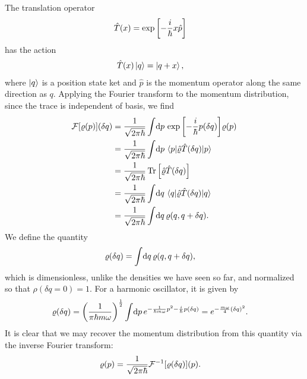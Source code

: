 The translation operator~\cite[651]{messiah1999quantum}
\begin{align}
	\hat{T}(x)
	&= \exp{\left[ - \frac{i}{\hbar} x \hat{p} \right]}
\end{align}
has the action~\cite[650]{messiah1999quantum}
\begin{align}
	\hat{T}(x) \ket{q}
	&= \ket{q + x},
\end{align}
where $\ket{q}$ is a position state ket and $\hat{p}$ is the momentum operator along the same direction as $q$.
Applying the Fourier transform to the momentum distribution, since the trace is independent of basis, we find
\begin{subequations}
\begin{align}
	\mathcal{F}[\rho(p)](\delta q)
	&= \frac{1}{\sqrt{2 \pi \hbar}} \int\! \dif p \, \expb{-\frac{i}{\hbar} p (\delta q)} \rho(p) \\
	&= \frac{1}{\sqrt{2 \pi \hbar}} \int\! \dif p \, \braket{p | \hat{\rho} \hat{T}(\delta q) | p} \\
	&= \frac{1}{\sqrt{2 \pi \hbar}} \Tr{\left[ \hat{\rho} \hat{T}(\delta q) \right]} \\
	&= \frac{1}{\sqrt{2 \pi \hbar}} \int\! \dif q \, \braket{q | \hat{\rho} \hat{T}(\delta q) | q} \\
	&= \frac{1}{\sqrt{2 \pi \hbar}} \int\! \dif q \, \rho(q, q + \delta q).
\end{align}
\end{subequations}
We define the quantity
\begin{align}
	\rho(\delta q)
	&= \int\! \dif q \, \rho(q, q + \delta q),
		\label{eq:rho-delta-q}
\end{align}
which is dimensionless, unlike the densities we have seen so far, and normalized so that $\rho(\delta q = 0) = 1$.
For a harmonic oscillator, it is given by
\begin{align}
	\rho(\delta q)
	&= \left( \frac{1}{\pi \hbar m \omega} \right)^\frac{1}{2} \int\! \dif p \, e^{-\frac{1}{\hbar m \omega} p^2 - \frac{i}{\hbar} p (\delta q)}
	= e^{-\frac{m \omega}{4} (\delta q)^2}.
\end{align}
It is clear that we may recover the momentum distribution from this quantity via the inverse Fourier transform:
\begin{align}
	\varrho(p)
	&= \frac{1}{\sqrt{2 \pi \hbar}} \mathcal{F}^{-1}[\varrho(\delta q)](p).
\end{align}

